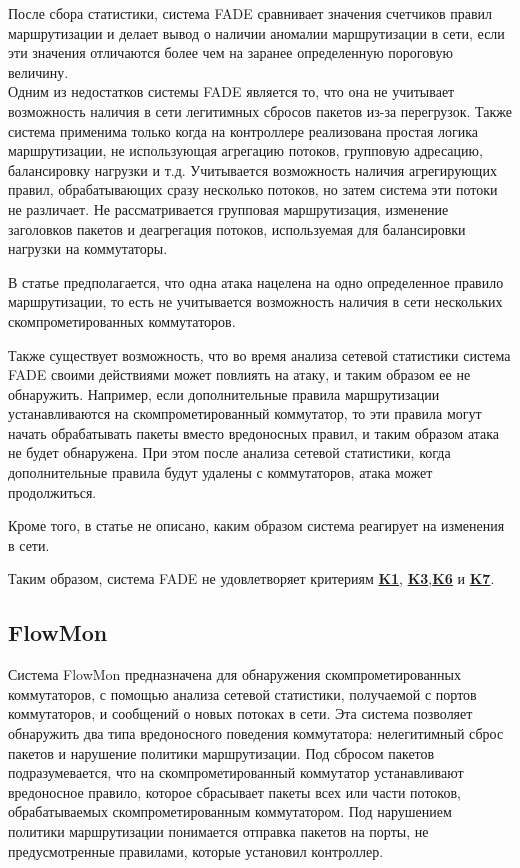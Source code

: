 \documentclass[../thesis.tex]{subfiles}
\begin{document}
После сбора статистики, система FADE сравнивает значения счетчиков правил маршрутизации и делает вывод о наличии аномалии маршрутизации в сети, если эти значения отличаются более чем на заранее определенную пороговую величину.
\\

Одним из недостатков системы FADE является то, что она не учитывает возможность наличия в сети легитимных сбросов пакетов из-за перегрузок.
Также система применима только когда на контроллере реализована простая логика маршрутизации, не использующая агрегацию потоков, групповую адресацию, балансировку нагрузки и т.д.
Учитывается возможность наличия агрегирующих правил, обрабатывающих сразу несколько потоков, но затем система эти потоки не различает.
Не рассматривается групповая маршрутизация, изменение заголовков пакетов и деагрегация потоков, используемая для балансировки нагрузки на коммутаторы.

В статье \cite{pang2016fade} предполагается, что одна атака нацелена на одно определенное правило маршрутизации, то есть не учитывается возможность наличия в сети нескольких скомпрометированных коммутаторов.

Также существует возможность, что во время анализа сетевой статистики система FADE своими действиями может повлиять на атаку, и таким образом ее не обнаружить.
Например, если дополнительные правила маршрутизации устанавливаются на скомпрометированный коммутатор, то эти правила могут начать обрабатывать пакеты вместо вредоносных правил, и таким образом атака не будет обнаружена.
При этом после анализа сетевой статистики, когда дополнительные правила будут удалены с коммутаторов, атака может продолжиться.

Кроме того, в статье не описано, каким образом система реагирует на изменения в сети.

{
\hypersetup{linkcolor=black}

Таким образом, система FADE не удовлетворяет критериям \hyperref[criterion:K1]{\textbf{K1}}, \hyperref[criterion:K3]{\textbf{K3}},\linebreak \hyperref[criterion:K6]{\textbf{K6}} и \hyperref[criterion:K7]{\textbf{K7}}.
}

\subsection{FlowMon} \label{subsection:flowmon}

Система FlowMon \cite{kamisinski2015flowmon} предназначена для обнаружения скомпрометированных коммутаторов, с помощью анализа сетевой статистики, получаемой с портов коммутаторов, и сообщений о новых потоках в сети.
Эта система позволяет обнаружить два типа вредоносного поведения коммутатора: нелегитимный сброс пакетов и нарушение политики маршрутизации.
Под сбросом пакетов подразумевается, что на скомпрометированный коммутатор устанавливают вредоносное правило, которое сбрасывает пакеты всех или части потоков, обрабатываемых скомпрометированным коммутатором.
Под нарушением политики маршрутизации понимается отправка пакетов на порты, не предусмотренные правилами, которые установил контроллер.
\end{document}
